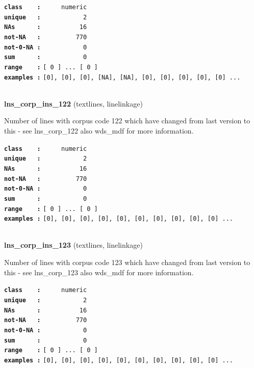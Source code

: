 \documentclass[]{article}
\begin{document}
\textbf{\texttt{class\ \ \ \ :}} \texttt{~~~~~numeric}\\
\textbf{\texttt{unique\ \ \ :}} \texttt{~~~~~~~~~~~2}\\
\textbf{\texttt{NAs\ \ \ \ \ \ :}} \texttt{~~~~~~~~~~16}\\
\textbf{\texttt{not-NA\ \ \ :}} \texttt{~~~~~~~~~770}\\
\textbf{\texttt{not-0-NA\ :}} \texttt{~~~~~~~~~~~0}\\
\textbf{\texttt{sum\ \ \ \ \ \ :}} \texttt{~~~~~~~~~~~0}\\
\textbf{\texttt{range\ \ \ \ :}}
\texttt{{[}\ 0\ {]}\ ...\ {[}\ 0\ {]}}\\
\textbf{\texttt{examples\ :}}
\texttt{{[}0{]},\ {[}0{]},\ {[}0{]},\ {[}NA{]},\ {[}NA{]},\ {[}0{]},\ {[}0{]},\ {[}0{]},\ {[}0{]},\ {[}0{]}\ ...}\\

~

\textbf{lns\_corp\_ins\_122} (textlines, linelinkage)

Number of lines with corpus code 122 which have changed from last
version to this - see lns\_corp\_122 also wds\_mdf for more information.

\textbf{\texttt{class\ \ \ \ :}} \texttt{~~~~~numeric}\\
\textbf{\texttt{unique\ \ \ :}} \texttt{~~~~~~~~~~~2}\\
\textbf{\texttt{NAs\ \ \ \ \ \ :}} \texttt{~~~~~~~~~~16}\\
\textbf{\texttt{not-NA\ \ \ :}} \texttt{~~~~~~~~~770}\\
\textbf{\texttt{not-0-NA\ :}} \texttt{~~~~~~~~~~~0}\\
\textbf{\texttt{sum\ \ \ \ \ \ :}} \texttt{~~~~~~~~~~~0}\\
\textbf{\texttt{range\ \ \ \ :}}
\texttt{{[}\ 0\ {]}\ ...\ {[}\ 0\ {]}}\\
\textbf{\texttt{examples\ :}}
\texttt{{[}0{]},\ {[}0{]},\ {[}0{]},\ {[}0{]},\ {[}0{]},\ {[}0{]},\ {[}0{]},\ {[}0{]},\ {[}0{]},\ {[}0{]}\ ...}\\

~

\textbf{lns\_corp\_ins\_123} (textlines, linelinkage)

Number of lines with corpus code 123 which have changed from last
version to this - see lns\_corp\_123 also wds\_mdf for more information.

\textbf{\texttt{class\ \ \ \ :}} \texttt{~~~~~numeric}\\
\textbf{\texttt{unique\ \ \ :}} \texttt{~~~~~~~~~~~2}\\
\textbf{\texttt{NAs\ \ \ \ \ \ :}} \texttt{~~~~~~~~~~16}\\
\textbf{\texttt{not-NA\ \ \ :}} \texttt{~~~~~~~~~770}\\
\textbf{\texttt{not-0-NA\ :}} \texttt{~~~~~~~~~~~0}\\
\textbf{\texttt{sum\ \ \ \ \ \ :}} \texttt{~~~~~~~~~~~0}\\
\textbf{\texttt{range\ \ \ \ :}}
\texttt{{[}\ 0\ {]}\ ...\ {[}\ 0\ {]}}\\
\textbf{\texttt{examples\ :}}
\texttt{{[}0{]},\ {[}0{]},\ {[}0{]},\ {[}0{]},\ {[}0{]},\ {[}0{]},\ {[}0{]},\ {[}0{]},\ {[}0{]},\ {[}0{]}\ ...}\\
\end{document}
